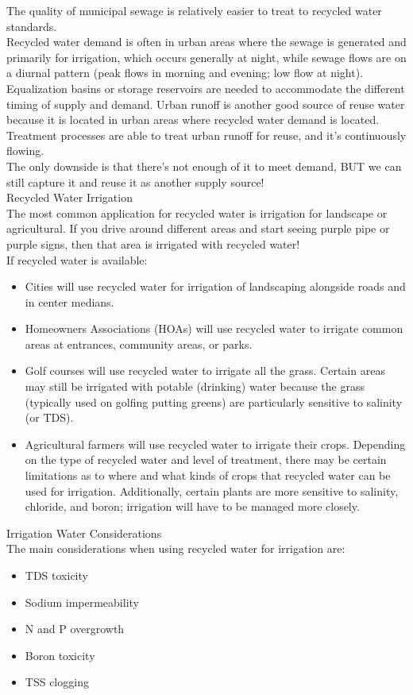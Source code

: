 \documentclass{article}
\begin{document}
The quality of municipal sewage is relatively easier to treat to recycled water standards.  
\\Recycled water demand is often in urban areas where the sewage is generated and primarily for irrigation, which occurs generally at night, while sewage flows are on a diurnal pattern (peak flows in morning and evening; low flow at night).  
\\Equalization basins or storage reservoirs are needed to accommodate the different timing of supply and demand. 
Urban runoff is another good source of reuse water because it is located in urban areas where recycled water demand is located. \\ 
Treatment processes are able to treat urban runoff for reuse, and it's continuously flowing.  \\
The only downside is that there's not enough of it to meet demand, BUT we can still capture it and reuse it as another supply source! \\
 
Recycled Water Irrigation\\

The most common application for recycled water is irrigation for landscape or agricultural.  If you drive around different areas and start seeing purple pipe or purple signs, then that area is irrigated with recycled water! \\
  
If recycled water is available:\\
\begin{itemize}
\item Cities will use recycled water for irrigation of landscaping alongside roads and in center medians. 
\item Homeowners Associations (HOAs) will use recycled water to irrigate common areas at entrances, community areas, or parks.
\item Golf courses will use recycled water to irrigate all the grass.  Certain areas may still be irrigated with potable (drinking) water because the grass (typically used on golfing putting greens) are particularly sensitive to salinity (or TDS). 
\item Agricultural farmers will use recycled water to irrigate their crops.  Depending on the type of recycled water and level of treatment, there may be certain limitations as to where and what kinds of crops that recycled water can be used for irrigation.  Additionally, certain plants are more sensitive to salinity, chloride, and boron; irrigation will have to be managed more closely.
\end{itemize}
Irrigation Water Considerations\\
The main considerations when using recycled water for irrigation are:\\
\begin{itemize}
\item TDS toxicity
\item Sodium impermeability
\item N and P overgrowth
\item Boron toxicity
\item TSS clogging
\end{itemize}
 
\end{document}
